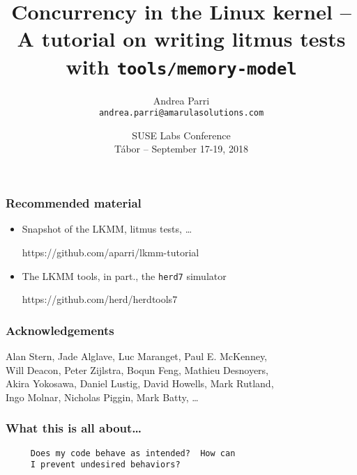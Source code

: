 \documentclass[usenames,dvipsnames]{beamer}
\title[]{Concurrency in the Linux kernel -- A tutorial on writing
	litmus tests with \texttt{tools/memory-model}}
\author[]{Andrea Parri \\
	  {\footnotesize \texttt{andrea.parri@amarulasolutions.com}}}
\date[]{SUSE Labs Conference \\
	T\'abor -- September 17-19, 2018}
\begin{document}
\begin{frame}
\maketitle
\end{frame}


\begin{frame}[fragile]
\frametitle{Recommended material}

\begin{itemize}
	\item Snapshot of the LKMM, litmus tests, \dots
\begin{center}
https://github.com/aparri/lkmm-tutorial
\end{center}

\vspace{4mm}
	\item The LKMM tools, in part., the \texttt{herd7} simulator
\begin{center}
		https://github.com/herd/herdtools7
\end{center}
\end{itemize}

\end{frame}


\begin{frame}[fragile]
\frametitle{Acknowledgements}

Alan Stern, Jade Alglave, Luc Maranget, Paul E. McKenney, \\
Will Deacon, Peter Zijlstra, Boqun Feng, Mathieu Desnoyers, \\
Akira Yokosawa, Daniel Lustig, David Howells, Mark Rutland, \\
Ingo Molnar, Nicholas Piggin, Mark Batty, \dots \\

\end{frame}


\begin{frame}[fragile]
\frametitle{What this is all about\dots}

\begin{verbatim}
     Does my code behave as intended?  How can
     I prevent undesired behaviors?
\end{verbatim}

\end{frame}
\end{document}
